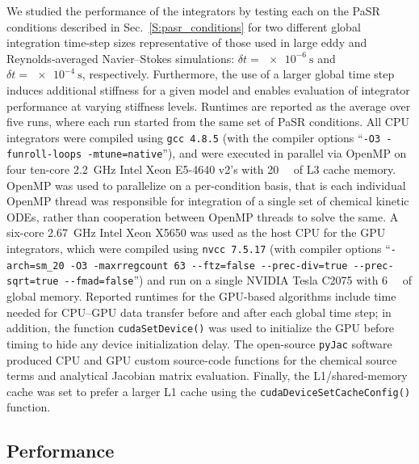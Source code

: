 \documentclass[final,twocolumn]{elsarticle}
\begin{document}
We studied the performance of the integrators by testing each on the PaSR conditions described in Sec.~\ref{S:pasr_conditions} for two different global integration time-step sizes representative of those used in large eddy and Reynolds-averaged Navier--Stokes simulations: $\delta t = \SI{e-6}{\s}$ and $\delta t = \SI{e-4}{\s}$, respectively.
Furthermore, the use of a larger global time step induces additional stiffness for a given model and enables evaluation of integrator performance at varying stiffness levels.
Runtimes are reported as the average over five runs, where each run started from the same set of PaSR conditions.
All CPU integrators were compiled using \texttt{gcc 4.8.5} (with the compiler options ``\texttt{-O3 -funroll-loops -mtune=native}''), and were executed in parallel via OpenMP on four ten-core \SI{2.2}{\giga\hertz} Intel Xeon E5-4640 v2's with \SI{20}{\mega\byte} of L3 cache memory.
OpenMP was used to parallelize on a per-condition basis, that is each individual OpenMP thread was responsible for integration of a single set of chemical kinetic ODEs, rather than cooperation between OpenMP threads to solve the same.
A six-core \SI{2.67}{\giga\hertz} Intel Xeon X5650 was used as the host CPU for the GPU integrators, which were compiled using \texttt{nvcc 7.5.17} (with compiler options ``\texttt{-arch=sm\_20 -O3 -maxrregcount 63 -{}-ftz=false -{}-prec-div=true -{}-prec-sqrt=true -{}-fmad=false}'') and run on a single NVIDIA Tesla C2075 with \SI{6}{\giga\byte} of global memory.
Reported runtimes for the GPU-based algorithms include time needed for CPU--GPU data transfer before and after each global time step; in addition, the function \texttt{cudaSetDevice()} was used to initialize the GPU before timing to hide any device initialization delay.
The open-source \texttt{pyJac} software~\cite{niemeyer_2016_51139,Niemeyer:2015ws,2016arXiv160503262N} produced CPU and GPU custom source-code functions for the chemical source terms and analytical Jacobian matrix evaluation.
Finally, the L1\slash shared-memory cache was set to prefer a larger L1 cache using the \texttt{cudaDeviceSetCacheConfig()} function.

\subsection{Performance}
\ifmeasure
\addvspace{10pt}
\fi
\end{document}
